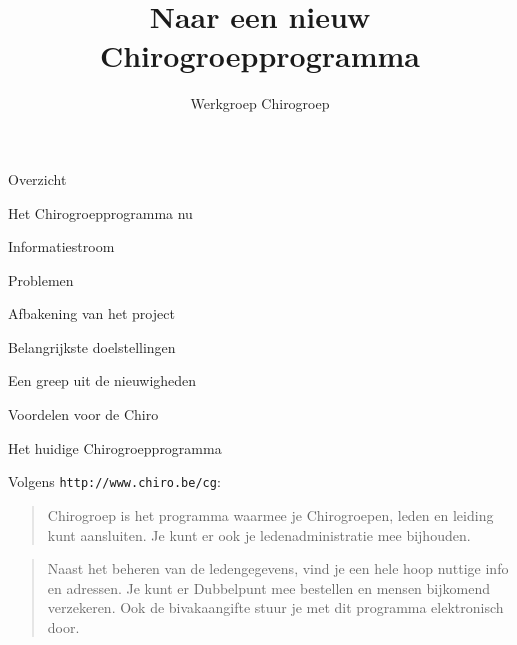 \documentclass[chiro,pdf]{prosper}
\title{Naar een nieuw Chirogroepprogramma}
\author{Werkgroep Chirogroep}
\begin{document}
\maketitle

%
%

{
\begin{slide}{Overzicht}

\begin{itemstep}
\item Het Chirogroepprogramma nu
\item Informatiestroom
\item Problemen
\item Afbakening van het project
\item Belangrijkste doelstellingen
\item Een greep uit de nieuwigheden
\item Voordelen voor de Chiro
\end{itemstep}

\end{slide}
}

%
%

{
\begin{slide}{Het huidige Chirogroepprogramma}

Volgens \texttt{http://www.chiro.be/cg}:

{
\begin{quotation}
Chirogroep is het programma waarmee je Chirogroepen, leden en leiding kunt aansluiten.
Je kunt er ook je ledenadministratie mee bijhouden.
\end{quotation}
}

{
\begin{quotation}
Naast het beheren van de ledengegevens, vind je een hele hoop nuttige info en adressen. Je kunt er Dubbelpunt mee bestellen en mensen bijkomend verzekeren. Ook de bivakaangifte stuur je met dit programma elektronisch door.
\end{quotation}
}

\end{slide}
}

%
%
\end{document}
